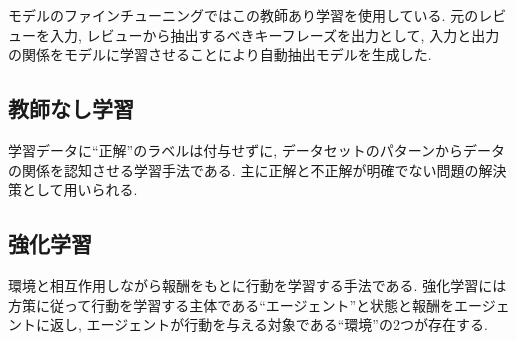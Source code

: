 モデルのファインチューニングではこの教師あり学習を使用している. 元のレビューを入力, レビューから抽出するべきキーフレーズを出力として, 入力と出力の関係をモデルに学習させることにより自動抽出モデルを生成した.

\subsection{教師なし学習}
学習データに``正解''のラベルは付与せずに, データセットのパターンからデータの関係を認知させる学習手法である. 主に正解と不正解が明確でない問題の解決策として用いられる. 


\subsection{強化学習}
環境と相互作用しながら報酬をもとに行動を学習する手法である. 強化学習には方策に従って行動を学習する主体である``エージェント''と状態と報酬をエージェントに返し, エージェントが行動を与える対象である``環境''の2つが存在する. 






